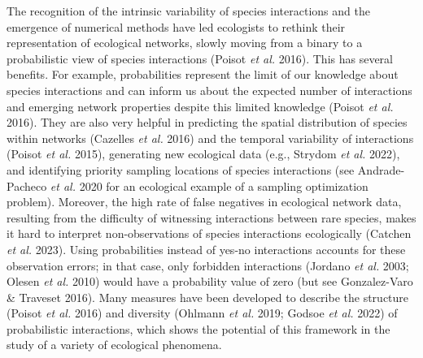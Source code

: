 \documentclass[11pt]{article}
\begin{document}
The recognition of the intrinsic variability of species interactions and
the emergence of numerical methods have led ecologists to rethink their
representation of ecological networks, slowly moving from a binary to a
probabilistic view of species interactions (Poisot \emph{et al.} 2016).
This has several benefits. For example, probabilities represent the
limit of our knowledge about species interactions and can inform us
about the expected number of interactions and emerging network
properties despite this limited knowledge (Poisot \emph{et al.} 2016).
They are also very helpful in predicting the spatial distribution of
species within networks (Cazelles \emph{et al.} 2016) and the temporal
variability of interactions (Poisot \emph{et al.} 2015), generating new
ecological data (e.g., Strydom \emph{et al.} 2022), and identifying
priority sampling locations of species interactions (see Andrade-Pacheco
\emph{et al.} 2020 for an ecological example of a sampling optimization
problem). Moreover, the high rate of false negatives in ecological
network data, resulting from the difficulty of witnessing interactions
between rare species, makes it hard to interpret non-observations of
species interactions ecologically (Catchen \emph{et al.} 2023). Using
probabilities instead of yes-no interactions accounts for these
observation errors; in that case, only forbidden interactions (Jordano
\emph{et al.} 2003; Olesen \emph{et al.} 2010) would have a probability
value of zero (but see Gonzalez-Varo \& Traveset 2016). Many measures
have been developed to describe the structure (Poisot \emph{et al.}
2016) and diversity (Ohlmann \emph{et al.} 2019; Godsoe \emph{et al.}
2022) of probabilistic interactions, which shows the potential of this
framework in the study of a variety of ecological phenomena.
\end{document}
